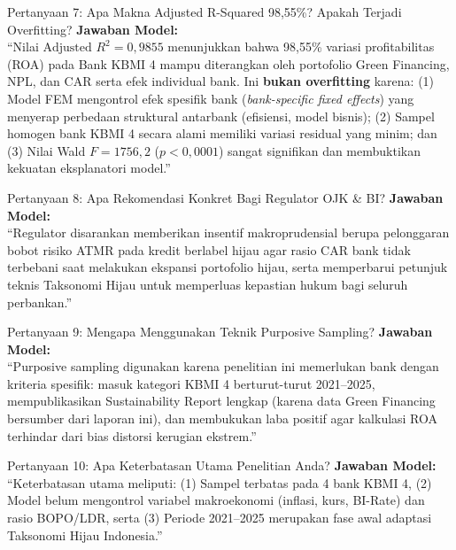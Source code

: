 \documentclass[11pt,a4paper]{article}
\begin{document}
\begin{qnabox}{Pertanyaan 7: Apa Makna Adjusted R-Squared 98,55\%? Apakah Terjadi Overfitting?}
\textbf{Jawaban Model:}\\
``Nilai $\text{Adjusted } R^2 = 0{,}9855$ menunjukkan bahwa 98,55\% variasi profitabilitas (ROA) pada Bank KBMI 4 mampu diterangkan oleh portofolio Green Financing, NPL, dan CAR serta efek individual bank. Ini \textbf{bukan overfitting} karena: (1) Model FEM mengontrol efek spesifik bank (\textit{bank-specific fixed effects}) yang menyerap perbedaan struktural antarbank (efisiensi, model bisnis); (2) Sampel homogen bank KBMI 4 secara alami memiliki variasi residual yang minim; dan (3) Nilai Wald $F = 1756{,}2$ ($p < 0{,}0001$) sangat signifikan dan membuktikan kekuatan eksplanatori model.''
\end{qnabox}

\begin{qnabox}{Pertanyaan 8: Apa Rekomendasi Konkret Bagi Regulator OJK \& BI?}
\textbf{Jawaban Model:}\\
``Regulator disarankan memberikan insentif makroprudensial berupa pelonggaran bobot risiko ATMR pada kredit berlabel hijau agar rasio CAR bank tidak terbebani saat melakukan ekspansi portofolio hijau, serta memperbarui petunjuk teknis Taksonomi Hijau untuk memperluas kepastian hukum bagi seluruh perbankan.''
\end{qnabox}

\begin{qnabox}{Pertanyaan 9: Mengapa Menggunakan Teknik Purposive Sampling?}
\textbf{Jawaban Model:}\\
``Purposive sampling digunakan karena penelitian ini memerlukan bank dengan kriteria spesifik: masuk kategori KBMI 4 berturut-turut 2021--2025, mempublikasikan Sustainability Report lengkap (karena data Green Financing bersumber dari laporan ini), dan membukukan laba positif agar kalkulasi ROA terhindar dari bias distorsi kerugian ekstrem.''
\end{qnabox}

\begin{qnabox}{Pertanyaan 10: Apa Keterbatasan Utama Penelitian Anda?}
\textbf{Jawaban Model:}\\
``Keterbatasan utama meliputi: (1) Sampel terbatas pada 4 bank KBMI 4, (2) Model belum mengontrol variabel makroekonomi (inflasi, kurs, BI-Rate) dan rasio BOPO/LDR, serta (3) Periode 2021--2025 merupakan fase awal adaptasi Taksonomi Hijau Indonesia.''
\end{qnabox}
\end{document}
